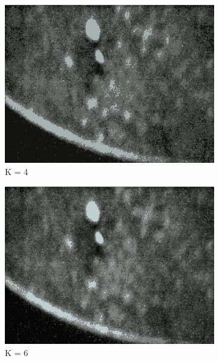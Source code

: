 \begin{figure}
        \centering
        \begin{subfigure}[b]{0.4\textwidth}
                \includegraphics[scale = 0.2]{img/segment4}
                \caption{K = 4}
        \end{subfigure}
		\quad
        \begin{subfigure}[b]{0.4\textwidth}
                \includegraphics[scale = 0.2]{img/segment6}
                \caption{K = 6}
        \end{subfigure} \hfill \\ \mbox{}\\
        \begin{subfigure}[b]{0.4\textwidth}

\end{subfigure}
\end{figure}
